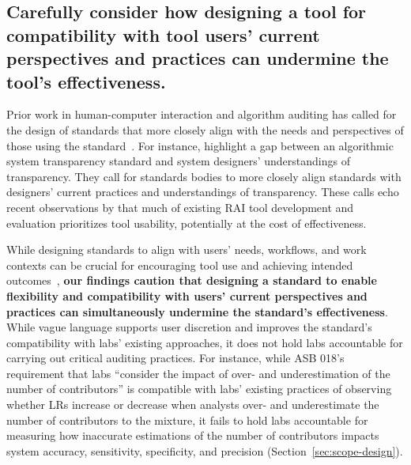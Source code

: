 \subsection{Carefully consider how designing a tool for compatibility with tool users’ current perspectives and practices can undermine the tool’s effectiveness.}
\label{sec:disc-compatibility}
Prior work in human-computer interaction and algorithm auditing has called for the design of standards that more closely align with the needs and perspectives of those using the standard~\cite{schor2024mind, ojewale2025towards}. For instance, \citet{schor2024mind} highlight a gap between an algorithmic system transparency standard and system designers’ understandings of transparency. They call for standards bodies to more closely align standards with designers' current practices and understandings of transparency. These calls echo recent observations by \citet{berman2024scoping} that much of existing RAI tool development and evaluation prioritizes tool usability, potentially at the cost of effectiveness. 


While designing standards to align with users’ needs, workflows, and work contexts can be crucial for encouraging tool use and achieving intended outcomes~\cite{madaio2020co, holstein2019improving, rakova2021responsible}, \textbf{our findings caution that designing a standard to enable flexibility and compatibility with users’ current perspectives and practices can simultaneously undermine the standard’s effectiveness}. While vague language supports user discretion and improves the standard’s compatibility with labs’ existing approaches, it does not hold labs accountable for carrying out critical auditing practices. For instance, while ASB 018's requirement that labs  ``consider the impact of over- and underestimation of the number of contributors'' is compatible with labs' existing practices of observing whether LRs increase or decrease when analysts over- and underestimate the number of contributors to the mixture, it fails to hold labs accountable for measuring how inaccurate estimations of the number of contributors impacts system accuracy, sensitivity, specificity, and precision (Section~\ref{sec:scope-design}). 


